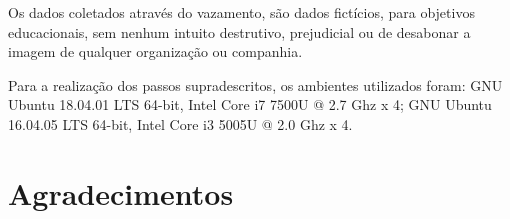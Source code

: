 \documentclass[
	article,			    %
	12pt,				    %
	oneside,			    %
	a4paper,			    %
	chapter=TITLE,		    %
	section=TITLE,		    %
	subsection=TITLE,	    %
	english,			    %
	brazil,				    %
	sumario=tradicional
]{abntex2}
\begin{document}
Os dados coletados através do vazamento, são dados fictícios, para objetivos educacionais, sem nenhum intuito destrutivo, prejudicial ou de desabonar a imagem de qualquer organização ou companhia.

Para a realização dos passos supradescritos, os ambientes utilizados foram: GNU Ubuntu 18.04.01 LTS 64-bit, Intel\textsuperscript{\tiny\textregistered} Core\textsuperscript{\tiny\texttrademark} i7 7500U @ 2.7 Ghz x 4; GNU Ubuntu 16.04.05 LTS 64-bit, Intel\textsuperscript{\tiny\textregistered} Core\textsuperscript{\tiny\texttrademark} i3 5005U @ 2.0 Ghz x 4.

\postextual

\begin{apendicesenv}
\end{apendicesenv}
\begin{anexosenv}
\vspace{\onelineskip}
\end{anexosenv}
\section*{Agradecimentos}
\end{document}
